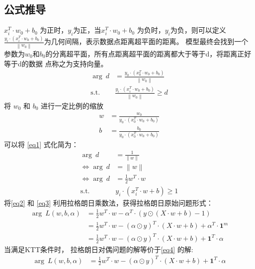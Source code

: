 \documentclass[12pt, a4paper, oneside]{ctexart}
\begin{document}
\subsection{公式推导}
$x_i^T \cdot w_0 + b_0$ 为正时，$y_i$为正，当$x_i^T \cdot w_0 + b_0$ 为负时，$y_i$为负，则可以定义
$\frac{y_i \cdot (x_i^T \cdot w_0 + b_0)}{ \left\|w_0\right\|}$为几何间隔，表示数据点距离超平面的距离。
模型最终会找到一个参数为$w_0$和$b_0$的分离超平面，所有点距离超平面的距离都大于等于d，将距离正好等于d的数据
点称之为支持向量。
\begin{align}
    \mathop{\arg\max_{w_0, b_0}} \ d &= \frac{y_0 \cdot (x_0^T \cdot w_0 + b_0)}{ \left\|w_0\right\|} 			\label{eq1}\\
	\mathrm{ s.t. }\ \   &\frac{y_i \cdot (x_i^T \cdot w_0 + b_0)}{ \left\|w_0\right\|} \geq d				\nonumber
\end{align}
将 $w_0$ 和 $b_0$ 进行一定比例的缩放
\begin{align}
	w &= \frac{w_0 }{ y_0 \cdot (x_0^T \cdot w_0 + b_0)} 			\nonumber\\
    b &= \frac{b_0 }{ y_0 \cdot (x_0^T \cdot w_0 + b_0)} 			\nonumber
\end{align}
可以将 \eqref{eq1} 式化简为：
\begin{align}
	\mathop{\arg\max_{w}} \ d &= \frac{1}{ \left\|w\right\|} 			\nonumber\\
    \iff \mathop{\arg\min_{w}}  \ d &=  \left\|w\right\| \nonumber\\
    \iff \mathop{\arg\min_{w}}  \ d &=  \frac{1}{2}w^T \cdot w \label{eq2}\\
    \mathrm{ s.t. }\ \   & y_i \cdot (x_i^T \cdot w + b) \geq 1				\label{eq3}
\end{align}
将\eqref{eq2} 和 \eqref{eq3} 利用拉格朗日乘数法，获得拉格朗日原始问题形式：
\begin{align}
    \mathop{\arg\min_{w,b}\max_{\alpha}} \ 	L(w, b, {\alpha}) &= \frac{1}{2}	w^T \cdot w  - {\alpha} ^T \cdot  (y \odot (X \cdot w + b) - 1) \nonumber\\
        &= \frac{1}{2}	w^T \cdot w  - (\alpha \odot y) ^T \cdot  (X \cdot w + b) + \alpha^T \cdot \boldsymbol{1}^m \nonumber\\
        &= \frac{1}{2}	w^T \cdot w  - (\alpha \odot y) ^T \cdot  (X \cdot w + b) + \boldsymbol{1}^T\cdot\alpha \label{eq4}
\end{align}
当满足KTT条件时， 拉格朗日对偶问题的解等价于\eqref{eq4} 的解:
\begin{align}
    \mathop{\arg\max_{\alpha}\min_{w,b}} \ 	L(w, b, {\alpha}) &= \frac{1}{2}	w^T \cdot w  - (\alpha \odot y) ^T \cdot  (X \cdot w + b) + \boldsymbol{1}^T\cdot\alpha \label{eq5}
\end{align}
\end{document}
